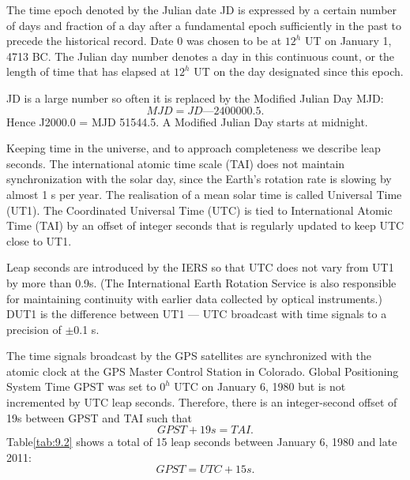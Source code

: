 	The time epoch denoted by the Julian date JD is expressed by a certain number of days and fraction of a day after a fundamental epoch sufficiently in the past to precede the historical record. Date 0 was chosen to be at $12^h$ UT on January 1, 4713 BC. The Julian day number denotes a day in this continuous count, or the length of time that has elapsed at $12^h$ UT on the day designated since this epoch.
	
	JD is a large number so often it is replaced by the Modified Julian Day MJD:
	$$MJD = JD — 2 400 000.5.$$
	Hence J2000.0 = MJD 51544.5. A Modified Julian Day starts at midnight.
	
	Keeping time in the universe, and to approach completeness we describe leap seconds. The international atomic time scale (TAI) does not maintain synchronization with the solar day, since the Earth’s rotation rate is slowing by almost 1 s per year. The realisation of a mean solar time is called Universal Time (UT1). The Coordinated Universal Time (UTC) is tied to International Atomic Time (TAI) by an offset of integer seconds that is regularly updated to keep UTC close to UT1.
	
	Leap seconds are introduced by the IERS so that UTC does not vary from UT1 by more than 0.9s. (The International Earth Rotation Service is also responsible for maintaining continuity with earlier data collected by optical instruments.) DUT1 is the difference between UT1 — UTC broadcast with time signals to a precision of $\pm$0.1 s.
	
	The time signals broadcast by the GPS satellites are synchronized with the atomic clock at the GPS Master Control Station in Colorado. Global Positioning System Time GPST was set to $0^h$ UTC on January 6, 1980 but is not incremented by UTC leap seconds.
	Therefore, there is an integer-second offset of 19s between GPST and TAI such that
	$$GPST + 19 s = TAI.$$
	Table\ref{tab:9.2} shows a total of 15 leap seconds between January 6, 1980 and late 2011:
	$$GPST = UTC + 15 s.$$
	
